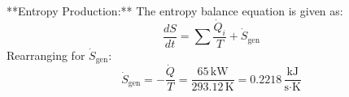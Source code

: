 **Entropy Production:**  
The entropy balance equation is given as:  
\[
\frac{dS}{dt} = \sum \frac{\dot{Q}_i}{T} + \dot{S}_{\text{gen}}
\]  
Rearranging for \( \dot{S}_{\text{gen}} \):  
\[
\dot{S}_{\text{gen}} = -\frac{\dot{Q}}{T} = \frac{65 \, \text{kW}}{293.12 \, \text{K}} = 0.2218 \, \frac{\text{kJ}}{\text{s·K}}
\]